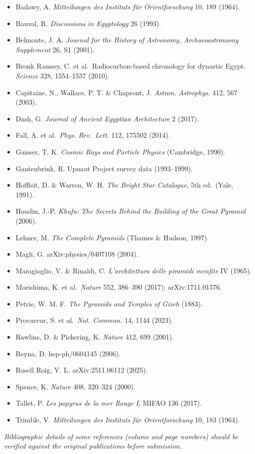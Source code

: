 \documentclass[
]{article}
\providecommand{\tightlist}{%
  \setlength{\itemsep}{0pt}\setlength{\parskip}{0pt}}
\begin{document}
\begin{itemize}
\tightlist
\item
  Badawy, A. \emph{Mitteilungen des Instituts für Orientforschung} 10,
  189 (1964).
\item
  Bauval, R. \emph{Discussions in Egyptology} 26 (1993).
\item
  Belmonte, J. A. \emph{Journal for the History of Astronomy,
  Archaeoastronomy Supplement} 26, S1 (2001).
\item
  Bronk Ramsey, C. et al.~Radiocarbon-based chronology for dynastic
  Egypt. \emph{Science} 328, 1554--1557 (2010).
\item
  Capitaine, N., Wallace, P. T. \& Chapront, J. \emph{Astron.
  Astrophys.} 412, 567 (2003).
\item
  Dash, G. \emph{Journal of Ancient Egyptian Architecture} 2 (2017).
\item
  Fall, A. et al.~\emph{Phys. Rev.~Lett.} 112, 175502 (2014).
\item
  Gaisser, T. K. \emph{Cosmic Rays and Particle Physics} (Cambridge,
  1990).
\item
  Gantenbrink, R. Upuaut Project survey data (1993--1999).
\item
  Hoffleit, D. \& Warren, W. H. \emph{The Bright Star Catalogue}, 5th
  ed.~(Yale, 1991).
\item
  Houdin, J.-P. \emph{Khufu: The Secrets Behind the Building of the
  Great Pyramid} (2006).
\item
  Lehner, M. \emph{The Complete Pyramids} (Thames \& Hudson, 1997).
\item
  Magli, G. arXiv:physics/0407108 (2004).
\item
  Maragioglio, V. \& Rinaldi, C. \emph{L'architettura delle piramidi
  menfite} IV (1965).
\item
  Morishima, K. et al.~\emph{Nature} 552, 386--390 (2017);
  arXiv:1711.01576.
\item
  Petrie, W. M. F. \emph{The Pyramids and Temples of Gizeh} (1883).
\item
  Procureur, S. et al.~\emph{Nat. Commun.} 14, 1144 (2023).
\item
  Rawlins, D. \& Pickering, K. \emph{Nature} 412, 699 (2001).
\item
  Reyna, D. hep-ph/0604145 (2006).
\item
  Rosell Roig, V. L. arXiv:2511.06112 (2025).
\item
  Spence, K. \emph{Nature} 408, 320--324 (2000).
\item
  Tallet, P. \emph{Les papyrus de la mer Rouge I}, MIFAO 136 (2017).
\item
  Trimble, V. \emph{Mitteilungen des Instituts für Orientforschung} 10,
  183 (1964).
\end{itemize}

\emph{Bibliographic details of some references (volume and page numbers)
should be verified against the original publications before submission.}
\end{document}
